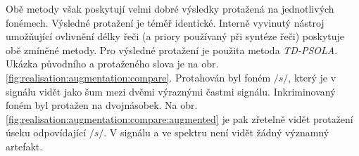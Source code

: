 
Obě metody však poskytují velmi dobré výsledky protažená na jednotlivých fonémech. Výsledné protažení je téměř identické. Interně vyvinutý nástroj umožňující ovlivnění délky řeči (a priory používaný při syntéze řeči) poskytuje obě zmíněné metody. Pro výsledné protažení je použita metoda \textit{TD-PSOLA}. Ukázka původního a protaženého slova  je na obr. \ref{fig:realisation:augmentation:compare}. Protahován byl foném $/s/$, který je v signálu vidět jako šum mezi dvěmi výraznými častmi signálu. Inkriminovaný foném byl protažen na dvojnásobek. Na obr. \ref{fig:realisation:augmentation:compare:augmented} je pak zřetelně vidět protažení úseku odpovídající $/s/$. V signálu a ve spektru není vidět žádný významný artefakt.

